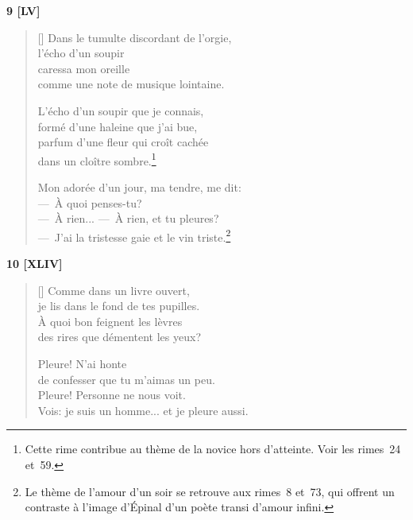 \documentclass[a4paper,12pt]{book}
\begin{document}
\begin{center}
  \textbf{9 [LV]}
\end{center}

\settowidth{\versewidth}{---~À rien... --~À rien, et tu pleures? --~J'ai la tristesse}

\begin{verse}[\versewidth]
  Dans le tumulte discordant de l'orgie, \\
  l'écho d'un soupir \\
  caressa mon oreille \\
  comme une note de musique lointaine.

  L'écho d'un soupir que je connais, \\
  formé d'une haleine que j'ai bue, \\
  parfum d'une fleur qui croît cachée \\
  dans un cloître sombre.\footnote{Cette rime contribue au thème de la
  novice hors d'atteinte. Voir les rimes~24 et~59.}

  Mon adorée d'un jour, ma tendre, me dit: \\
  ---~À quoi penses-tu? \\
  ---~À rien... ---~À rien, et tu pleures? \\
  ---~J'ai la tristesse gaie et le vin triste.\footnote{Le thème de l'amour d'un soir se
  retrouve aux rimes~8 et~73, qui offrent un contraste à l'image
  d'Épinal d'un poète transi d'amour infini.}
\end{verse}

\bigskip

\begin{center}
  \textbf{10 [XLIV]}
\end{center}

\settowidth{\versewidth}{Vois: je suis un homme... et je pleure aussi!}

\begin{verse}[\versewidth]
  Comme dans un livre ouvert, \\
  je lis dans le fond de tes pupilles. \\
  À quoi bon feignent les lèvres \\
  des rires que démentent les yeux?

  Pleure! N'ai honte \\
  de confesser que tu m'aimas un peu. \\
  Pleure! Personne ne nous voit. \\
  Vois: je suis un homme... et je pleure aussi.
\end{verse}
\end{document}
